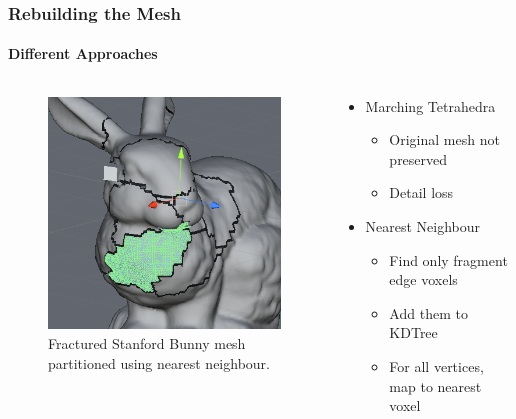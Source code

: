 \documentclass{beamer}
\begin{document}
	\begin{frame}
	\frametitle{Rebuilding the Mesh}
	\framesubtitle{Different Approaches}
		\begin{columns}[T] %
			\begin{column}[T]{5cm} %
				\begin{figure}
					\centerline{\includegraphics[scale=0.5]{Porcelain.png}}
					\caption{Fractured Stanford Bunny mesh partitioned using nearest neighbour.}
				\end{figure}
			\end{column}
			\begin{column}[T]{5cm} %
				\begin{itemize}
				\item{Marching Tetrahedra}
					\begin{itemize}
						\item{Original mesh not preserved}
						\item{Detail loss}
					\end{itemize}
				\item{Nearest Neighbour}
					\begin{itemize}
						\item{Find only fragment edge voxels}
						\item{Add them to KDTree}
						\item{For all vertices, map to nearest voxel}
					\end{itemize}
				\end{itemize}
			\end{column}
		\end{columns}
	\end{frame}
\end{document}
